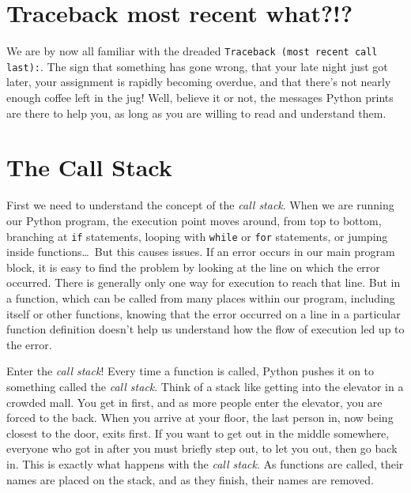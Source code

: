 \section{Traceback most recent what?!?}

We are by now all familiar with the dreaded 
\texttt{Traceback (most   recent call last):}. The sign that something has gone wrong, that   your late night just got later, your assignment is rapidly becoming   overdue, and that there's not nearly enough coffee left in the jug!   Well, believe it or not, the messages Python prints are there to help   you, as long as you are willing to read and understand them.

\section{The Call Stack}

First we need to understand the concept of the \textit{call stack}. When we   are running our Python program, the execution point moves around, from   top to bottom, branching at \texttt{if} statements, looping with \texttt{while} or \texttt{for}   statements, or jumping inside functions\ldots\  But this causes issues. If   an error occurs in our main program block, it is easy to find the problem by                  looking at the line on which the error occurred. There is generally only one way for   execution to reach that line. But in a function, which can be called   from many places within our program, including itself or other   functions, knowing that the error occurred on a line in a particular   function definition doesn't help us understand how the flow of   execution led up to the error.

Enter the \textit{call stack}! Every time a   function is called, Python pushes it on to something called the \textit{call   stack}. Think of a stack like getting into the elevator in a crowded   mall. You get in first, and as more people enter the elevator, you are   forced to the back. When you arrive at your floor, the last person in,   now being closest to the door, exits first. If you want to get out in   the middle somewhere, everyone who got in after you must briefly step   out, to let you out, then go back in. This is exactly what happens with   the \textit{call stack}. As functions are called, their names are placed on the   stack, and as they finish, their names are removed.

